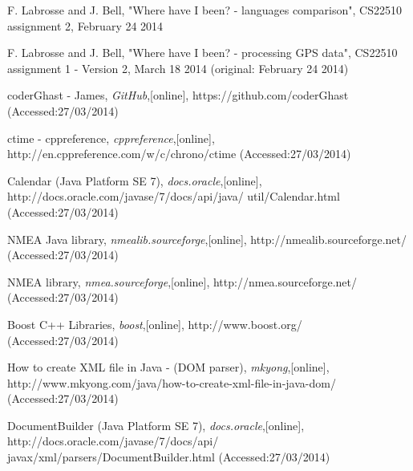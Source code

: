 \documentclass{article}
\begin{document}
\begin{thebibliography}{10}

 F. Labrosse and J. Bell, "Where have I been? - languages comparison", CS22510 assignment 2, February 24 2014

 F. Labrosse and J. Bell, "Where have I been? - processing GPS data", CS22510 assignment 1 - Version 2, March 18 2014 (original: February 24 2014)

 coderGhast - James, {\em GitHub},[online], https://github.com/coderGhast (Accessed:27/03/2014)

 ctime - cppreference, {\em cppreference},[online], http://en.cppreference.com/w/c/chrono/ctime (Accessed:27/03/2014)

 Calendar (Java Platform SE 7), {\em docs.oracle},[online], http://docs.oracle.com/javase/7/docs/api/java/ util/Calendar.html (Accessed:27/03/2014)

 NMEA Java library, {\em nmealib.sourceforge},[online], http://nmealib.sourceforge.net/ (Accessed:27/03/2014)

 NMEA library, {\em nmea.sourceforge},[online], http://nmea.sourceforge.net/ (Accessed:27/03/2014)

 Boost C++ Libraries, {\em boost},[online], http://www.boost.org/ (Accessed:27/03/2014)

 How to create XML file in Java - (DOM parser), {\em mkyong},[online], http://www.mkyong.com/java/how-to-create-xml-file-in-java-dom/ (Accessed:27/03/2014)

 DocumentBuilder (Java Platform SE 7), {\em docs.oracle},[online], http://docs.oracle.com/javase/7/docs/api/ javax/xml/parsers/DocumentBuilder.html (Accessed:27/03/2014)

\end{thebibliography}
\end{document}
